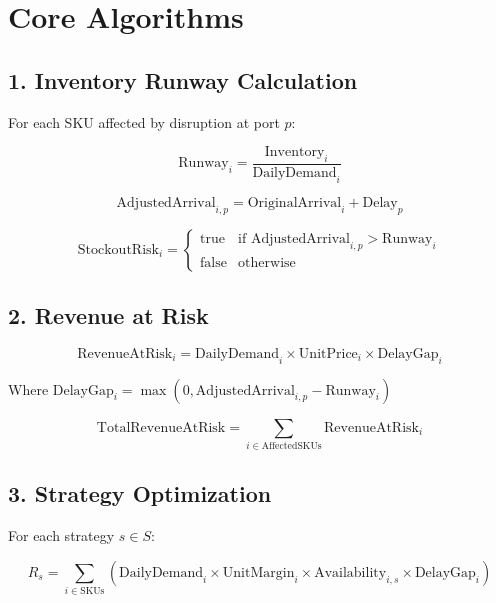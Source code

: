 \documentclass[11pt]{article}
\begin{document}
\section{Core Algorithms}

\subsection{1. Inventory Runway Calculation}

For each SKU affected by disruption at port $p$:

\begin{equation}
\text{Runway}_i = \frac{\text{Inventory}_i}{\text{DailyDemand}_i}
\end{equation}

\begin{equation}
\text{AdjustedArrival}_{i,p} = \text{OriginalArrival}_i + \text{Delay}_p
\end{equation}

\begin{equation}
\text{StockoutRisk}_i = \begin{cases} 
\text{true} & \text{if } \text{AdjustedArrival}_{i,p} > \text{Runway}_i \\
\text{false} & \text{otherwise}
\end{cases}
\end{equation}

\subsection{2. Revenue at Risk}

\begin{equation}
\text{RevenueAtRisk}_i = \text{DailyDemand}_i \times \text{UnitPrice}_i \times \text{DelayGap}_i
\end{equation}

Where $\text{DelayGap}_i = \max(0, \text{AdjustedArrival}_{i,p} - \text{Runway}_i)$

\begin{equation}
\text{TotalRevenueAtRisk} = \sum_{i \in \text{AffectedSKUs}} \text{RevenueAtRisk}_i
\end{equation}

\subsection{3. Strategy Optimization}

For each strategy $s \in S$:

\begin{equation}
R_s = \sum_{i \in \text{SKUs}} (\text{DailyDemand}_i \times \text{UnitMargin}_i \times \text{Availability}_{i,s} \times \text{DelayGap}_i)
\end{equation}
\end{document}

